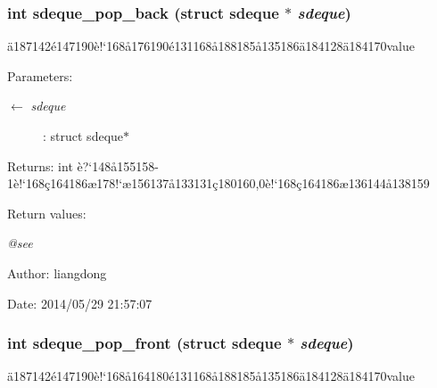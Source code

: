 \subsubsection{\setlength{\rightskip}{0pt plus 5cm}int sdeque\_\-pop\_\-back (struct sdeque $\ast$ {\em sdeque})}\label{sdeque_8c_a6}


\"{a}187142\'{e}147190\`{e}!`168\aa{}176190\'{e}131168\aa{}188185\aa{}135186\"{a}184128\"{a}184170value 

\begin{Desc}
\item[Parameters:]
\begin{description}
\item[\mbox{$\leftarrow$} {\em sdeque}]: struct sdeque$\ast$ \end{description}
\end{Desc}
\begin{Desc}
\item[Returns:]int \`{e}?`148\aa{}155158-1\`{e}!`168\c{c}164186\ae{}178!`\ae{}156137\aa{}133131\c{c}180160,0\`{e}!`168\c{c}164186\ae{}136144\aa{}138159 \end{Desc}
\begin{Desc}
\item[Return values:]
\begin{description}
\item[{\em @see}]\end{description}
\end{Desc}
\begin{Desc}
\item[Author:]liangdong \end{Desc}
\begin{Desc}
\item[Date:]2014/05/29 21:57:07 \end{Desc}
\subsubsection{\setlength{\rightskip}{0pt plus 5cm}int sdeque\_\-pop\_\-front (struct sdeque $\ast$ {\em sdeque})}\label{sdeque_8c_a3}


\"{a}187142\'{e}147190\`{e}!`168\aa{}164180\'{e}131168\aa{}188185\aa{}135186\"{a}184128\"{a}184170value 

